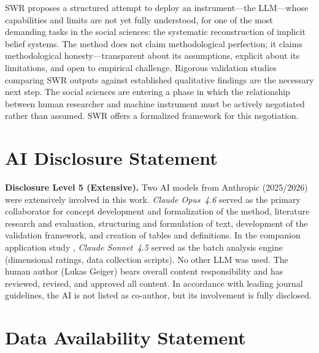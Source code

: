 \documentclass[11pt,a4paper]{article}
\theoremstyle{definition}
\theoremstyle{plain}
\theoremstyle{remark}
\begin{document}
SWR proposes a structured attempt to deploy an instrument---the LLM---whose capabilities and limits are not yet fully understood, for one of the most demanding tasks in the social sciences: the systematic reconstruction of implicit belief systems. The method does not claim methodological perfection; it claims methodological honesty---transparent about its assumptions, explicit about its limitations, and open to empirical challenge. Rigorous validation studies comparing SWR outputs against established qualitative findings are the necessary next step. The social sciences are entering a phase in which the relationship between human researcher and machine instrument must be actively negotiated rather than assumed. SWR offers a formalized framework for this negotiation.



\section*{AI Disclosure Statement}

\noindent\textbf{Disclosure Level 5 (Extensive).} Two AI models from Anthropic (2025/2026) were extensively involved in this work. \emph{Claude Opus~4.6} served as the primary collaborator for concept development and formalization of the method, literature research and evaluation, structuring and formulation of text, development of the validation framework, and creation of tables and definitions. In the companion application study \citep{Geiger2026b}, \emph{Claude Sonnet~4.5} served as the batch analysis engine (dimensional ratings, data collection scripts). No other LLM was used. The human author (Lukas Geiger) bears overall content responsibility and has reviewed, revised, and approved all content. In accordance with leading journal guidelines, the AI is not listed as co-author, but its involvement is fully disclosed.



\section*{Data Availability Statement}
\end{document}
